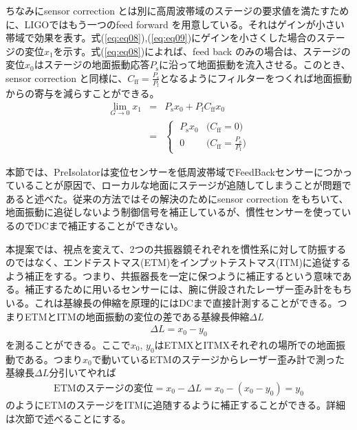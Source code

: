 \documentclass[a4paper,12pt]{jsarticle}
\begin{document}
ちなみにsensor correction とは別に高周波帯域のステージの要求値を満たすために、LIGOではもう一つのfeed forward を用意している。それはゲインが小さい帯域で効果を表す。式(\ref{eq:eq08}),(\ref{eq:eq09})にゲインを小さくした場合のステージの変位$x_1$を示す。式(\ref{eq:eq08})によれば、feed back のみの場合は、ステージの変位$x_0$はステージの地面振動応答$P_{\mathrm{s}}$に沿って地面振動を流入させる。このとき、sensor correction と同様に、$C_{\mathrm{ff}}=\frac{P_{\mathrm{s}}}{P_{\mathrm{f}}}$となるようにフィルターをつくれば地面振動からの寄与を減らすことができる。
\begin{eqnarray}\label{eq:eq08}
  \lim_{G \to 0} x_{1} &=& P_{\mathrm{s}}x_0 + P_{\mathrm{f}}C_{\mathrm{ff}}x_0 \\
  &=& 
  \begin{cases}\label{eq:eq09}
    \; P_{\mathrm{s}}x_{0} & \text{($C_{\mathrm{ff}}=0$)}\\
    \; 0 & \text{($C_{\mathrm{ff}}=\frac{P_{\mathrm{s}}}{P_{\mathrm{f}}}$)} 
  \end{cases}  
\end{eqnarray}


本節では、PreIsolatorは変位センサーを低周波帯域でFeedBackセンサーにつかっていることが原因で、ローカルな地面にステージが追随してしまうことが問題であると述べた。従来の方法ではその解決のためにsensor correction をもちいて、地面振動に追従しないよう制御信号を補正しているが、慣性センサーを使っているのでDCまで補正することができない。

本提案では、視点を変えて、2つの共振器鏡それぞれを慣性系に対して防振するのではなく、エンドテストマス(ETM)をインプットテストマス(ITM)に追従するよう補正をする。つまり、共振器長を一定に保つように補正するという意味である。補正するために用いるセンサーには、腕に併設されたレーザー歪み計をもちいる。これは基線長の伸縮を原理的にはDCまで直接計測することができる。つまりETMとITMの地面振動の変位の差である基線長伸縮$\Delta{L}$
\begin{eqnarray}
  \Delta{L} = x_0-y_0
\end{eqnarray}
を測ることができる。ここで$x_0,\,y_0$はETMXとITMXそれぞれの場所での地面振動である。つまり$x_0$で動いているETMのステージからレーザー歪み計で測った基線長$\Delta{L}$分引いてやれば
\begin{eqnarray}
  \mathrm{ETM}のステージの変位 = x_0 - \Delta{L} = x_0-(x_0-y_0) = y_0
\end{eqnarray}
のようにETMのステージをITMに追随するように補正することができる。詳細は次節で述べることにする。
\end{document}
